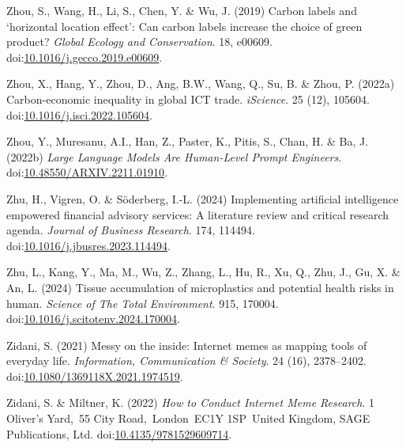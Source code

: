 \documentclass[
  letterpaper,
  DIV=11,
  numbers=noendperiod]{scrartcl}
\newlength{\cslhangindent}
\newenvironment{CSLReferences}[2] %
 {\begin{list}{}{%
  \setlength{\itemindent}{0pt}
  \setlength{\leftmargin}{0pt}
  \setlength{\parsep}{0pt}
  \ifodd #1
   \setlength{\leftmargin}{\cslhangindent}
   \setlength{\itemindent}{-1\cslhangindent}
  \fi
  \setlength{\itemsep}{#2\baselineskip}}}
 {\end{list}}
\begin{document}
\begin{CSLReferences}{0}{1}
Zhou, S., Wang, H., Li, S., Chen, Y. \& Wu, J. (2019) Carbon labels and
{`horizontal location effect'}: {Can} carbon labels increase the choice
of green product? \emph{Global Ecology and Conservation}. 18, e00609.
doi:\href{https://doi.org/10.1016/j.gecco.2019.e00609}{10.1016/j.gecco.2019.e00609}.

Zhou, X., Hang, Y., Zhou, D., Ang, B.W., Wang, Q., Su, B. \& Zhou, P.
(2022a) Carbon-economic inequality in global {ICT} trade.
\emph{iScience}. 25 (12), 105604.
doi:\href{https://doi.org/10.1016/j.isci.2022.105604}{10.1016/j.isci.2022.105604}.

Zhou, Y., Muresanu, A.I., Han, Z., Paster, K., Pitis, S., Chan, H. \&
Ba, J. (2022b) \emph{Large {Language Models Are Human-Level Prompt
Engineers}}.
doi:\href{https://doi.org/10.48550/ARXIV.2211.01910}{10.48550/ARXIV.2211.01910}.

Zhu, H., Vigren, O. \& Söderberg, I.-L. (2024) Implementing artificial
intelligence empowered financial advisory services: {A} literature
review and critical research agenda. \emph{Journal of Business
Research}. 174, 114494.
doi:\href{https://doi.org/10.1016/j.jbusres.2023.114494}{10.1016/j.jbusres.2023.114494}.

Zhu, L., Kang, Y., Ma, M., Wu, Z., Zhang, L., Hu, R., Xu, Q., Zhu, J.,
Gu, X. \& An, L. (2024) Tissue accumulation of microplastics and
potential health risks in human. \emph{Science of The Total
Environment}. 915, 170004.
doi:\href{https://doi.org/10.1016/j.scitotenv.2024.170004}{10.1016/j.scitotenv.2024.170004}.

Zidani, S. (2021) Messy on the inside: Internet memes as mapping tools
of everyday life. \emph{Information, Communication \& Society}. 24 (16),
2378--2402.
doi:\href{https://doi.org/10.1080/1369118X.2021.1974519}{10.1080/1369118X.2021.1974519}.

Zidani, S. \& Miltner, K. (2022) \emph{How to {Conduct Internet Meme
Research}}. 1 Oliver's Yard,~55 City Road,~London~EC1Y 1SP~United
Kingdom, SAGE Publications, Ltd.
doi:\href{https://doi.org/10.4135/9781529609714}{10.4135/9781529609714}.


\end{CSLReferences}
\end{document}
